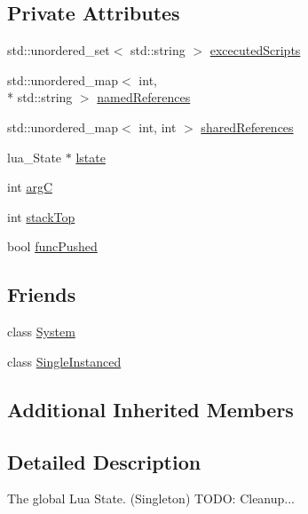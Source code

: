 \subsection*{Private Attributes}
\begin{DoxyCompactItemize}
\item 
std\+::unordered\+\_\+set$<$ std\+::string $>$ \hyperlink{classZeta_1_1LuaEngine_ac2c806337f55ab7d87e09fdbb052c4ce}{excecuted\+Scripts}
\item 
std\+::unordered\+\_\+map$<$ int, \\*
std\+::string $>$ \hyperlink{classZeta_1_1LuaEngine_ab5b777346b1ce3fbb8848d72eb3657ad}{named\+References}
\item 
std\+::unordered\+\_\+map$<$ int, int $>$ \hyperlink{classZeta_1_1LuaEngine_a6ae178c96d635fedd5de66fca06af4b2}{shared\+References}
\item 
lua\+\_\+\+State $\ast$ \hyperlink{classZeta_1_1LuaEngine_a3ea9f2a55e1fe3037f542c88a2b1c652}{lstate}
\item 
int \hyperlink{classZeta_1_1LuaEngine_a8ca9a31f2d28f6c0928cebe3990aef4b}{arg\+C}
\item 
int \hyperlink{classZeta_1_1LuaEngine_a7d5faf4154dcd428f46435070bb6972f}{stack\+Top}
\item 
bool \hyperlink{classZeta_1_1LuaEngine_a9bb8e36de6cd25f3d8c9acec396f00a6}{func\+Pushed}
\end{DoxyCompactItemize}
\subsection*{Friends}
\begin{DoxyCompactItemize}
\item 
class \hyperlink{classZeta_1_1LuaEngine_af18a9ee98e70982bfe2975391d7221a5}{System}
\item 
class \hyperlink{classZeta_1_1LuaEngine_a2fa95d69b32a77fffa4b730679a8b08c}{Single\+Instanced}
\end{DoxyCompactItemize}
\subsection*{Additional Inherited Members}


\subsection{Detailed Description}
The global Lua State. (Singleton) T\+O\+D\+O\+: Cleanup... 

